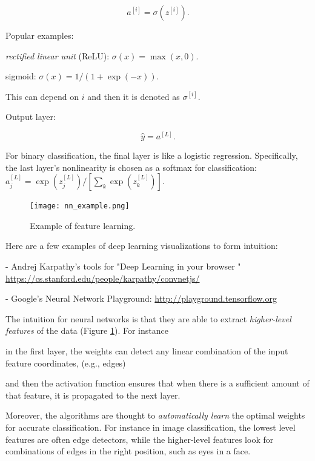 \documentclass[english]{article}
\begin{document}
$$a^{[i]} = \sigma(z^{[i]}).$$


Popular examples: 

\bitem 
\item \emph{rectified linear unit} (ReLU): $\sigma(x) = \max(x,0)$. 
\item sigmoid: $\sigma(x) = 1/(1+\exp(-x))$. 
\eitem 

This can depend on $i$ and then it is denoted as $\sigma^{[i]}$. 


\item Output layer: 

$$\hat y = a^{[L]}.$$

For binary classification, the final layer is like a logistic regression. Specifically, the last layer's nonlinearity is chosen as a softmax for classification: $a^{[L]}_j = \exp(z^{[L]}_j)/[\sum_k\exp(z^{[L]}_k)]$.


\eenum 


\eenum 


\begin{figure}
  \centering
  \texttt{[image: nn\_example.png]}
  \caption{Example of feature learning.}
  \label{fl}
\end{figure}

\item Here are a few examples of deep learning visualizations to form intuition: 

- Andrej Karpathy's tools for "Deep Learning in your browser
" \url{https://cs.stanford.edu/people/karpathy/convnetjs/}

- Google's Neural Network Playground: \url{http://playground.tensorflow.org}


\item 
The intuition for neural networks is that they are able to extract \emph{higher-level features} of the data (Figure \ref{fl}). For instance 

\benum 
\item in the first layer, the weights can detect any linear combination of the input feature coordinates, (e.g., edges)
\item and then the activation function ensures that when there is a sufficient amount of that feature, it is propagated to the next layer. 
\eenum 


Moreover, the algorithms are thought to \emph{automatically learn} the optimal weights for accurate classification.  For instance in image classification, the lowest level features are often edge detectors, while the higher-level features look for combinations of edges in the right position, such as eyes in a face. 
\end{document}

